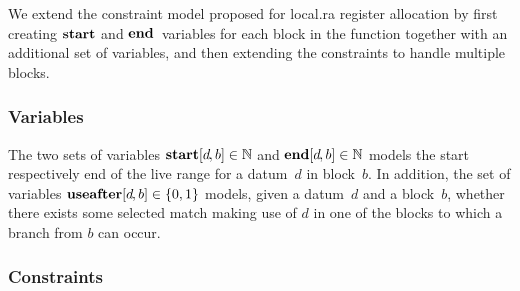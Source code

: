We extend the \gls{constraint model} proposed for \gls{local.ra} \gls{register
  allocation} by first creating $\mVar{start}$ and $\mVar{end}$~\glspl{variable}
for each \gls{block} in the \gls{function} together with an additional set of
\glspl{variable}, and then extending the \glspl{constraint} to handle multiple
\glspl{block}.


\subsubsection{Variables}

The two sets of \glspl{variable} \mbox{$\mVar{start}[d \hspace{-1pt}, b] \in
  \mNatNumSet$} and \mbox{$\mVar{end}[d \hspace{-1pt}, b] \in \mNatNumSet$}
models the start respectively end of the \gls{live range} for a \gls{datum}~$d$
in \gls{block}~$b$\hspace{-1pt}.
%
In addition, the set of \glspl{variable} \mbox{$\mVar{useafter}[d \hspace{-1pt},
    b] \in \mSet{0, 1}$} models, given a \gls{datum}~$d$ and a
\gls{block}~$b$\hspace{-1pt}, whether there exists some selected \gls{match}
making use of $d$ in one of the \glspl{block} to which a branch from $b$ can
occur.


\subsubsection{Constraints}

